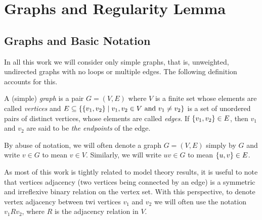 \section{Graphs and Regularity Lemma} \label{sec:section_2}



    \subsection{Graphs and Basic Notation} \label{subsec:subsection_2.1}

        In all this work we will consider only simple graphs, that is, unweighted, undirected graphs with no loops or
        multiple edges.
        The following definition accounts for this.

        \begin{definition}
            A (simple) \emph{graph} is a pair $G = (V, E)$ where $V$ is a finite set whose elements are called \emph{vertices}
            and $E \subseteq \{ \{ v_1, v_2 \} \mid v_1, v_2 \in V \text{ and } v_1 \neq v_2 \}$ is a set of
            unordered pairs of distinct vertices, whose elements are called \emph{edges}.
            If $\{ v_1, v_2 \} \in E$, then $v_1$ and $v_2$ are said to be \emph{the endpoints} of the edge.
        \end{definition}


        By abuse of notation, we will often denote a graph $G = (V, E)$ simply by $G$ and write $v \in G$ to mean $v \in V$.
        Similarly, we will write $u v \in G$ to mean $\{ u, v \} \in E$.

        As most of this work is tightly related to model theory results, it is useful to note that vertices adjacency
        (two vertices being connected by an edge) is a symmetric and irreflexive binary relation on the
        vertex set.
        With this perspective, to denote vertex adjacency between twi vertices $v_1$ and $v_2$ we will often use the
        notation $v_1 R v_2$, where $R$ is the adjacency relation in $V$.

